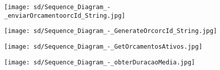 \documentclass[relatorio.tex]{subfiles}
\begin{document}
\begin{landscape}
\begin{figure} \centering \texttt{[image: sd/Sequence\_Diagram\_-\_enviarOrcamentoorcId\_String.jpg]} \end{figure}
\begin{figure} \centering \texttt{[image: sd/Sequence\_Diagram\_-\_GenerateOrcorcId\_String.jpg]} \end{figure}
\begin{figure} \centering \texttt{[image: sd/Sequence\_Diagram\_-\_GetOrcamentosAtivos.jpg]} \end{figure}
\begin{figure} \centering \texttt{[image: sd/Sequence\_Diagram\_-\_obterDuracaoMedia.jpg]} \end{figure}

\end{landscape}
\end{document}
